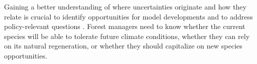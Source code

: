 \documentclass[11pt,letter]{article}
\begin{document}
Gaining a better understanding of where uncertainties originate and how they relate is crucial to identify opportunities for model developments \citep{Petchey2015} and to address policy-relevant questions \citep{Urban2016}. Forest managers need to know whether the current species will be able to tolerate future climate conditions, whether they can rely on its natural regeneration, or whether they should capitalize on new species opportunities.
% 

\clearpage


\end{document}
